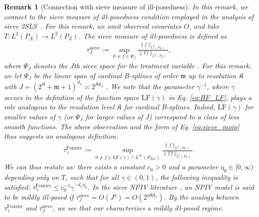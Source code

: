 \documentclass[11pt]{article}
\newcommand{\0}{\mathbf{0}}
\newtheorem{rem}{Remark}[section]
\begin{document}
\begin{rem}[Connection with sieve measure of ill-posedness]
\label{rem:connection_smoip}
In this remark, we connect  to the sieve measure of ill-posedness condition employed in the analysis of sieve 2SLS~\citep{blundell2007semi, Chen_2018, chen2024adaptiveestimationuniformconfidence,kim2025optimality}. For this remark, we omit observed covariates $O$, and take $T : L^2(P_{X})\to L^2(P_{Z})$. The sieve measure of ill-posedness is defined as
\begin{align}\label{eq:sieve_moip}
    \tau_J^{\mathrm{sieve}} := \sup_{0\neq f\in \Psi_J} \frac{\|f\|_{L^2(P_{X})}}{\|Tf\|_{L^2(P_{Z})}},
\end{align}
where $\Psi_J$ denotes the $J$th sieve space for the treatment variable \citep[Section 3]{Chen_2018}. For this remark, we let $\Psi_J$ be the linear span of cardinal B-splines of order $\mathfrak{m}$ up to resolution $\mathfrak{K}$ with $J = (2^{\mathfrak{K}} + \mathfrak{m} + 1)^{d_x} \asymp 2^{\mathfrak{K}d_x}$ \citep[Section 5]{devore1993constructive}. We note that the parameter $\gamma^{-1}$, where $\gamma$ occurs in the definition of the function space $\mathrm{LF}(\gamma)$ in Eq. \eqref{eq:HF_LF}, plays a role analogous to the resolution level $\mathfrak{K}$ for cardinal B-splines. Indeed, $\mathrm{LF}(\gamma)$ for smaller values of $\gamma$ (or $\Psi_J$ for larger values of $J$) correspond to a class of less smooth functions. The above observation and the form of Eq. \eqref{eq:sieve_moip} thus suggests an analogous definition:
\begin{align}\label{eq:kernel_moip}
    \tau_{\gamma}^{\mathrm{Fourier}} := \sup_{0\neq f\in \mathrm{LF}(\gamma)\cap L^{\infty}(P_{XO})} \frac{\|f\|_{L^2(P_{X})}}{\|Tf\|_{L^2(P_{Z})}}. 
\end{align}
We can thus restate  as: there exists a constant $c_0>0$ and a parameter $\eta_0\in [0,\infty)$ depending only on $T$, such that for all $\gamma\in (0,1)$, the following inequality is satisfied: $\tau_{\gamma}^{\mathrm{Fourier}}\leq c_0^{-1}\gamma^{-d_x\eta_0}$. 
In the sieve NPIV literature \citep{blundell2007semi,chen2024adaptiveestimationuniformconfidence, Chen_2018}, an NPIV model is said to be \emph{mildly ill-posed} if $\tau_{J}^{\mathrm{sieve}} = O(J^{\eta}) = O(2^{\eta\mathfrak{K}d_x})$. By the analogy between $\tau_{\gamma}^{\mathrm{Fourier}}$ and $\tau_{J}^{\mathrm{sieve}}$, we see that our  characterizes a \emph{mildly ill-posed} regime.
\end{rem}
\end{document}
